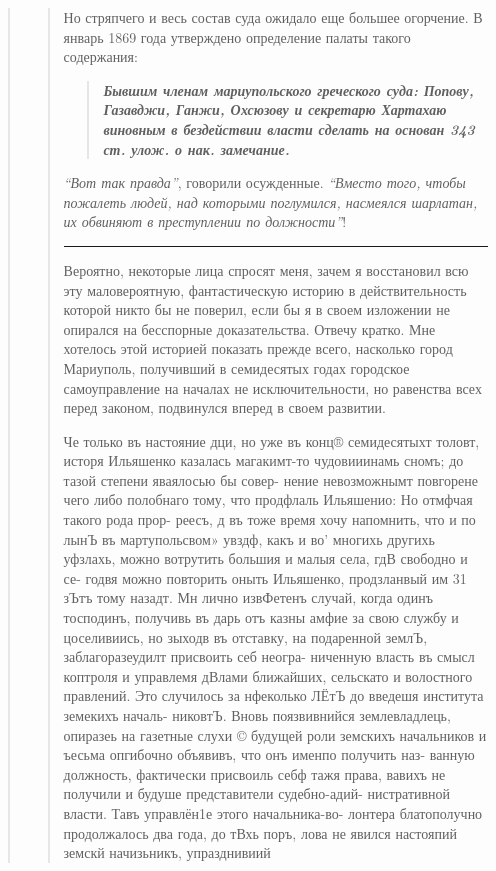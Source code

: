 \begin{quote}
\begin{quote}
Но стряпчего и весь состав суда ожидало еще большее огорчение. В январь 
1869 года утверждено определение
палаты такого содержания: 

\begin{quote}
\em\bfseries
Бывшим членам мариупольского
греческого суда: Попову, Газавджи, Ганжи, Охсюзову и
секретарю Хартахаю виновным в бездействии власти сделать на основан 343 ст. улож. о нак. замечание.
\end{quote}

\emph{``Вот так правда''}, говорили осужденные. \emph{``Вместо того, чтобы пожалеть людей, 
над которыми поглумился, насмеялся шарлатан, их обвиняют в преступлении по должности''}!

\par\noindent\rule{\textwidth}{0.4pt}

Вероятно, некоторые лица спросят меня, зачем я
восстановил всю эту маловероятную, фантастическую историю
в действительность которой никто бы не поверил, если бы я в своем изложении 
не опирался на бесспорные доказательства. Отвечу кратко. Мне хотелось этой историей
показать прежде всего, насколько город Мариуполь, получивший в 
семидесятых годах городское самоуправление
на началах не исключительности, но равенства всех перед законом, подвинулся вперед в своем развитии. 

Че
только въ настояние дци, но уже въ конц® семидесятыхт
толовт, исторя Ильяшенко казалась ма гакимт-то
чудовииинамь сномъ; до тазой степени яваялосью бы совер-
нение невозможнымт повгорене чего либо полобнаго тому,
что продфлаль Ильяшенио: Но отмфчая такого рода прор-
реесъ, д въ тоже время хочу напомнить, что и по лынЪ въ
мартупольсвом» увздф, какъ и во’ многихь другихь уфзлахь,
можно вотрутить большия и малыя села, гдВ свободно и се-
годвя можно повторить оныть Ильяшенко, продзланвый им
31 зЪтъ тому назадт. Мн лично извФетенъ случай, когда
одинъ тосподинъ, получивь въ дарь отъ казны амфие за
свою службу и цоселивиись, но зыходв въ отставку, на
подаренной землЪ, заблагоразеудилт присвоить себ неогра-
ниченную власть въ смысл коптроля и управлемя дВлами
ближайших, сельскато и волостного правлений. Это случилось
за нфеколько ЛЁтЪ до введешя института земекихъ началь-
никовтЪ. Вновь поязвивнийся землевладлець, опиразеь на
газетные слухи © будущей роли земскихъ начальников и
ъесьма опгибочно объявивъ, что онъ именпо получить наз-
ванную должность, фактически присвоиль себф тажя права,
вавихъ не получили и будуше представители судебно-адий-
нистративной власти. Тавъ управлён1е этого начальника-во-
лонтера блатополучно продолжалось два года, до тВхь поръ,
лова не явился настояпий земскй начизьникъ, упразднивиий


\end{quote}
\end{quote}
